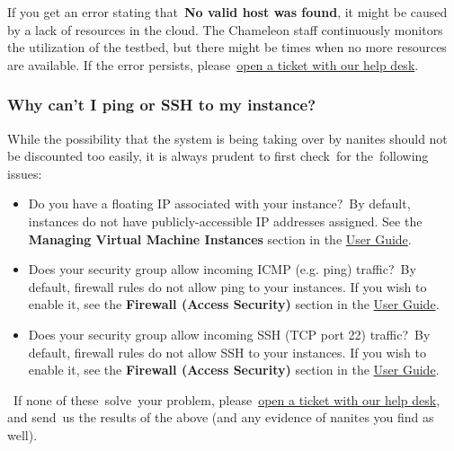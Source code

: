 If you get an error stating that~\textbf{No valid host was found}, it
might be caused by a lack of resources in the cloud. The Chameleon staff
continuously monitors the utilization of the testbed, but there might be
times when no more resources are available. If the error persists,
please~\href{https://www.chameleoncloud.org/user/help/}{open a ticket
with our help desk}.

\subsubsection{Why can't I ping or SSH to my
instance?}\label{why-cant-i-ping-or-ssh-to-my-instance}

While the possibility that the system is being taking over by nanites
should not be discounted too easily, it is always prudent to first
check~for the~following issues:

\begin{itemize}
\item
  Do you have a floating IP associated with your instance?~By default,
  instances do not have publicly-accessible IP addresses assigned. See
  the \textbf{Managing Virtual Machine Instances} section in the
  \href{https://www.chameleoncloud.org/docs/user-guides/openstack-kvm-user-guide/}{User
  Guide}.
\item
  Does your security group allow incoming ICMP (e.g. ping) traffic?~By
  default, firewall rules do not allow ping to your instances. If you
  wish to enable it, see the \textbf{Firewall (Access Security)} section
  in the
  \href{https://www.chameleoncloud.org/docs/user-guides/openstack-kvm-user-guide/}{User
  Guide}.
\item
  Does your security group allow incoming SSH (TCP port 22) traffic?~By
  default, firewall rules do not allow SSH to your instances. If you
  wish to enable it, see the \textbf{Firewall (Access Security)} section
  in the
  \href{https://www.chameleoncloud.org/docs/user-guides/openstack-kvm-user-guide/}{User
  Guide}.
\end{itemize}

~If none of these~solve~your problem,
please~\href{https://www.chameleoncloud.org/user/help/}{open a ticket
with our help desk}, and send~us the results of the above (and any
evidence of nanites you find as well).

